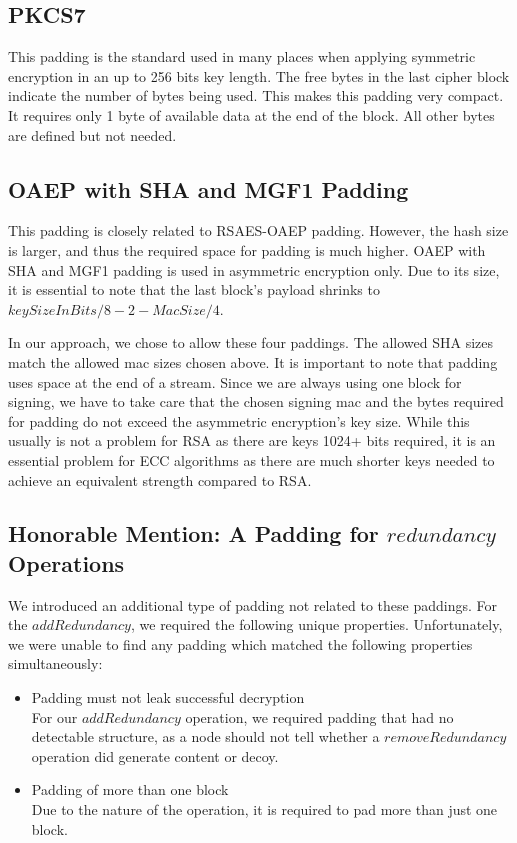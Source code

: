 \subsection{PKCS7} 
This padding is the standard used in many places when applying symmetric encryption in an up to 256 bits key length. The free bytes in the last cipher block indicate the number of bytes being used. This makes this padding very compact. It requires only 1 byte of available data at the end of the block. All other bytes are defined but not needed.

\subsection{OAEP with SHA and MGF1 Padding} 
This padding is closely related to RSAES-OAEP padding. However, the hash size is larger, and thus the required space for padding is much higher. OAEP with SHA and MGF1 padding is used in asymmetric encryption only. Due to its size, it is essential to note that the last block's payload shrinks to $keySizeInBits/8-2-MacSize/4$.

In our approach, we chose to allow these four paddings. The allowed SHA sizes match the allowed mac sizes chosen above. It is important to note that padding uses space at the end of a stream. Since we are always using one block for signing, we have to take care that the chosen signing mac and the bytes required for padding do not exceed the asymmetric encryption's key size. While this usually is not a problem for RSA as there are keys 1024+ bits required, it is an essential problem for ECC algorithms as there are much shorter keys needed to achieve an equivalent strength compared to RSA. 

\subsection{Honorable Mention: A Padding for \texorpdfstring{$redundancy$}{redundancy} Operations}
We introduced an additional type of padding not related to these paddings. For the $addRedundancy$, we required the following unique properties. Unfortunately, we were unable to find any padding which matched the following properties simultaneously:

\begin{itemize}
	\item Padding must not leak successful decryption\\
	For our $addRedundancy$ operation, we required padding that had no detectable structure, as a node should not tell whether a $removeRedundancy$ operation did generate content or decoy. 
	\item Padding of more than one block\\
	Due to the nature of the operation, it is required to pad more than just one block.
\end{itemize}

